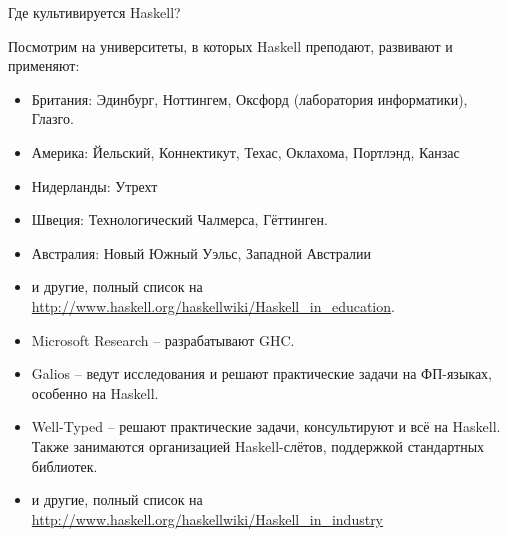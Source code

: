 Где культивируется Haskell?


Посмотрим на университеты, в которых Haskell преподают, развивают и
применяют:

\begin{itemize}
\item
  Британия: Эдинбург, Ноттингем, Оксфорд (лаборатория информатики),
  Глазго.
\item
  Америка: Йельский, Коннектикут, Техас, Оклахома, Портлэнд, Канзас
\item
  Нидерланды: Утрехт
\item
  Швеция: Технологический Чалмерса, Гёттинген.
\item
  Австралия: Новый Южный Уэльс, Западной Австралии
\item
  и другие, полный список на
  \url{http://www.haskell.org/haskellwiki/Haskell_in_education}.
\end{itemize}


\begin{itemize}
\item
  Microsoft Research -- разрабатывают GHC.
\item
  Galios -- ведут исследования и решают практические задачи на
  ФП-языках, особенно на Haskell.
\item
  Well-Typed -- решают практические задачи, консультируют и всё на
  Haskell. Также занимаются организацией Haskell-слётов, поддержкой
  стандартных библиотек.
\item
  и другие, полный список на
  \url{http://www.haskell.org/haskellwiki/Haskell_in_industry}
\end{itemize}
